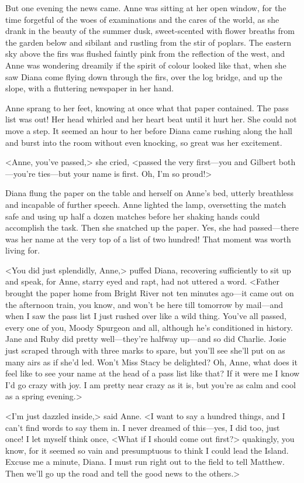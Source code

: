 But one evening the news came. Anne was sitting at her open window, for the time forgetful of the woes of examinations and the cares of the world, as she drank in the beauty of the summer dusk, sweet-scented with flower breaths from the garden below and sibilant and rustling from the stir of poplars. The eastern sky above the firs was flushed faintly pink from the reflection of the west, and Anne was wondering dreamily if the spirit of colour looked like that, when she saw Diana come flying down through the firs, over the log bridge, and up the slope, with a fluttering newspaper in her hand.

Anne sprang to her feet, knowing at once what that paper contained. The pass list was out! Her head whirled and her heart beat until it hurt her. She could not move a step. It seemed an hour to her before Diana came rushing along the hall and burst into the room without even knocking, so great was her excitement.

<Anne, you've passed,> she cried, <passed the very first—you and Gilbert both—you're ties—but your name is first. Oh, I'm so proud!>

Diana flung the paper on the table and herself on Anne's bed, utterly breathless and incapable of further speech. Anne lighted the lamp, oversetting the match safe and using up half a dozen matches before her shaking hands could accomplish the task. Then she snatched up the paper. Yes, she had passed—there was her name at the very top of a list of two hundred! That moment was worth living for.

<You did just splendidly, Anne,> puffed Diana, recovering sufficiently to sit up and speak, for Anne, starry eyed and rapt, had not uttered a word. <Father brought the paper home from Bright River not ten minutes ago—it came out on the afternoon train, you know, and won't be here till tomorrow by mail—and when I saw the pass list I just rushed over like a wild thing. You've all passed, every one of you, Moody Spurgeon and all, although he's conditioned in history. Jane and Ruby did pretty well—they're halfway up—and so did Charlie. Josie just scraped through with three marks to spare, but you'll see she'll put on as many airs as if she'd led. Won't Miss Stacy be delighted? Oh, Anne, what does it feel like to see your name at the head of a pass list like that? If it were me I know I'd go crazy with joy. I am pretty near crazy as it is, but you're as calm and cool as a spring evening.>

<I'm just dazzled inside,> said Anne. <I want to say a hundred things, and I can't find words to say them in. I never dreamed of this—yes, I did too, just once! I let myself think once, <What if I should come out first?> quakingly, you know, for it seemed so vain and presumptuous to think I could lead the Island. Excuse me a minute, Diana. I must run right out to the field to tell Matthew. Then we'll go up the road and tell the good news to the others.>

